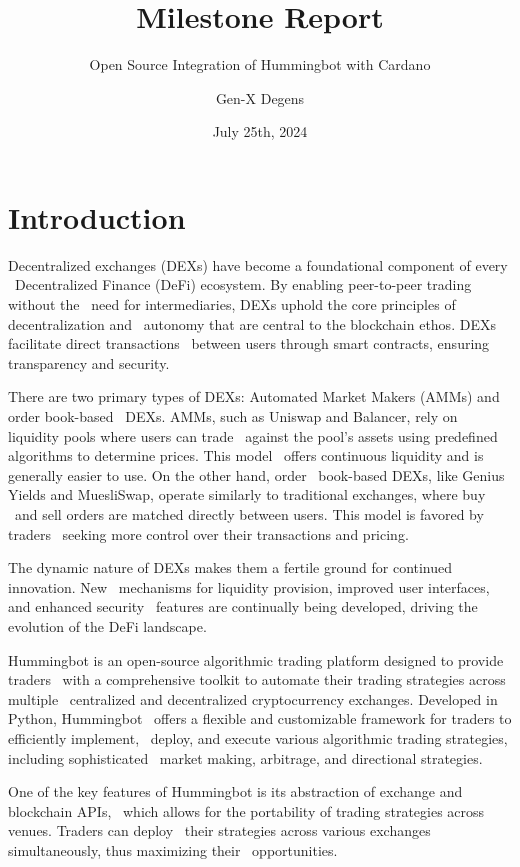 \documentclass{scrreport}
\title{Milestone Report}
\subtitle{Open Source Integration of Hummingbot with Cardano}
\author{Gen-X Degens}
\date{July 25th, 2024}
\begin{document}
\maketitle

\section{Introduction}

Decentralized exchanges (DEXs) have become a foundational component of every \
Decentralized Finance (DeFi) ecosystem. By enabling peer-to-peer trading without the \
need for intermediaries, DEXs uphold the core principles of decentralization and \
autonomy that are central to the blockchain ethos. DEXs facilitate direct transactions \
between users through smart contracts, ensuring transparency and security.

There are two primary types of DEXs: Automated Market Makers (AMMs) and order book-based \
DEXs. AMMs, such as Uniswap and Balancer, rely on liquidity pools where users can trade \
against the pool's assets using predefined algorithms to determine prices. This model \
offers continuous liquidity and is generally easier to use. On the other hand, order \
book-based DEXs, like Genius Yields and MuesliSwap, operate similarly to traditional exchanges, where buy \
and sell orders are matched directly between users. This model is favored by traders \
seeking more control over their transactions and pricing.

The dynamic nature of DEXs makes them a fertile ground for continued innovation. New \
mechanisms for liquidity provision, improved user interfaces, and enhanced security \
features are continually being developed, driving the evolution of the DeFi landscape.
\newline

Hummingbot is an open-source algorithmic trading platform designed to provide traders \
with a comprehensive toolkit to automate their trading strategies across multiple \
centralized and decentralized cryptocurrency exchanges. Developed in Python, Hummingbot \
offers a flexible and customizable framework for traders to efficiently implement, \
deploy, and execute various algorithmic trading strategies, including sophisticated \
market making, arbitrage, and directional strategies.

One of the key features of Hummingbot is its abstraction of exchange and blockchain APIs, \
which allows for the portability of trading strategies across venues. Traders can deploy \
their strategies across various exchanges simultaneously, thus maximizing their \
opportunities.
\newline
\end{document}
